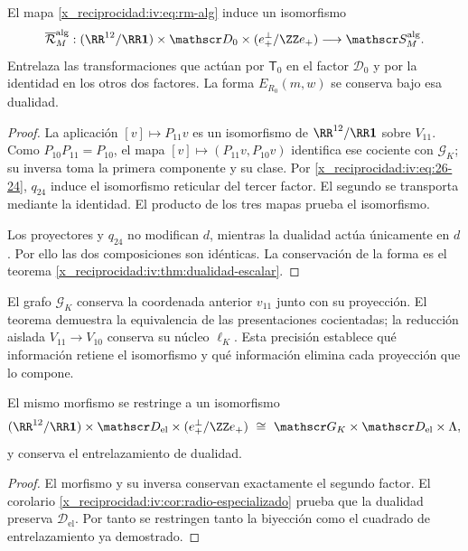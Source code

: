 \begin{theorem}
\label{x_reciprocidad:iv:thm:pantallas-isomorfas}
\label{x_reciprocidad:thm:k-pantallas-coordinadas}
El mapa \eqref{x_reciprocidad:iv:eq:rm-alg} induce un isomorfismo
\[
 \overline{\mathcal R}_M^{\mathrm{alg}}:
 (\RR^{12}/\RR\mathbf1)\times\mathscr D_0
 \times(e_+^\perp/\ZZ e_+)
 \longrightarrow\mathscr S_M^{\mathrm{alg}}.
\]
Entrelaza las transformaciones que actúan por \(\mathsf T_0\)
en el factor \(\mathscr D_0\) y por la identidad en los
otros dos factores. La forma \(E_{R_0}(m,w)\) se conserva
bajo esa dualidad.
\end{theorem}
\begin{proof}
La aplicación \([v]\mapsto P_{11}v\) es un isomorfismo
de \(\RR^{12}/\RR\mathbf1\) sobre \(V_{11}\).
Como \(P_{10}P_{11}=P_{10}\), el mapa
\([v]\mapsto(P_{11}v,P_{10}v)\) identifica ese cociente
con \(\mathscr G_K\); su inversa toma la primera componente
y su clase. Por \eqref{x_reciprocidad:iv:eq:26-24}, \(q_{24}\) induce el
isomorfismo reticular del tercer factor. El segundo se
transporta mediante la identidad. El producto de los tres
mapas prueba el isomorfismo.

Los proyectores y \(q_{24}\) no modifican \(d\), mientras
la dualidad actúa únicamente en \(d\). Por ello las dos
composiciones son idénticas. La conservación de la forma
es el teorema \ref{x_reciprocidad:iv:thm:dualidad-escalar}.
\end{proof}

El grafo \(\mathscr G_K\) conserva la coordenada anterior
\(v_{11}\) junto con su proyección. El teorema demuestra
la equivalencia de las presentaciones cocientadas; la reducción
aislada \(V_{11}\to V_{10}\) conserva su núcleo
\(\ell_K\). Esta precisión establece qué información
retiene el isomorfismo y qué información elimina cada
proyección que lo compone.

\begin{corollary}
El mismo morfismo se restringe a un isomorfismo
\[
 (\RR^{12}/\RR\mathbf1)\times\mathscr D_{\mathrm{el}}
 \times(e_+^\perp/\ZZ e_+)
 \ \cong\ \mathscr G_K\times\mathscr D_{\mathrm{el}}\times\Lambda,
\]
y conserva el entrelazamiento de dualidad.
\end{corollary}
\begin{proof}
El morfismo y su inversa conservan exactamente el segundo factor.
El corolario \ref{x_reciprocidad:iv:cor:radio-especializado} prueba que la dualidad
preserva \(\mathscr D_{\mathrm{el}}\). Por tanto se restringen
tanto la biyección como el cuadrado de entrelazamiento ya demostrado.
\end{proof}

